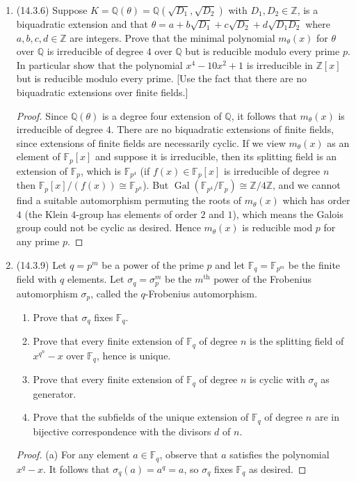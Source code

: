 \documentclass[11pt]{article}
\DeclareMathOperator{\Gal}{Gal}
\DeclareMathOperator{\id}{id}
\begin{document}
\begin{enumerate}
\begin{proof}
        (e) Observe that the group above is given by the presentation $\abr{\sigma,\tau\mid \sigma^4=\id_E,\sigma^2=\tau^2,\sigma\tau = \tau\sigma^{-1}}$, which is $Q_8$, the quaternion group of order $8$, up to isomorphism.
        \end{proof}
    \item (14.3.6) Suppose $K = \mathbb{Q}(\theta) = \mathbb{Q}(\sqrt{D_1},\sqrt{D_2})$ with $D_1,D_2\in\mathbb{Z}$, is a biquadratic extension and that $\theta = a+b\sqrt{D_1} + c\sqrt{D_2} + d\sqrt{D_1D_2}$ where $a,b,c,d\in\mathbb{Z}$ are integers. Prove that the minimal polynomial $m_\theta(x)$ for $\theta$ over $\mathbb{Q}$ is irreducible of degree $4$ over $\mathbb{Q}$ but is reducible modulo every prime $p$. In particular show that the polynomial $x^4-10x^2+1$ is irreducible in $\mathbb{Z}[x]$ but is reducible modulo every prime. [Use the fact that there are no biquadratic extensions over finite fields.] \begin{proof}
        Since $\mathbb{Q}(\theta)$ is a degree four extension of $\mathbb{Q}$, it follows that $m_\theta(x)$ is irreducible of degree $4$. There are no biquadratic extensions of finite fields, since extensions of finite fields are necessarily cyclic. If we view $m_\theta(x)$ as an element of $\mathbb{F}_p[x]$ and suppose it is irreducible, then its splitting field is an extension of $\mathbb{F}_p$, which is $\mathbb{F}_{p^4}$ (if $f(x)\in \mathbb{F}_p[x]$ is irreducible of degree $n$ then $\mathbb{F}_p[x]/(f(x))\cong \mathbb{F}_{p^n}$). But $\Gal(\mathbb{F}_{p^4}/\mathbb{F}_p)\cong \mathbb{Z}/4\mathbb{Z}$, and we cannot find a suitable automorphism permuting the roots of $m_\theta(x)$ which has order $4$ (the Klein $4$-group has elements of order $2$ and $1$), which means the Galois group could not be cyclic as desired. Hence $m_\theta(x)$ is reducible mod $p$ for any prime $p$.
    \end{proof}
    \item (14.3.9) Let $q = p^m$ be a power of the prime $p$ and let $\mathbb{F}_q = \mathbb{F}_{p^m}$ be the finite field with $q$ elements. Let $\sigma_q = \sigma_p^m$ be the $m^{\text{th}}$ power of the Frobenius automorphism $\sigma_p$, called the $q$-Frobenius automorphism. \begin{enumerate}
        \item Prove that $\sigma_q$ fixes $\mathbb{F}_q$.
        \item Prove that every finite extension of $\mathbb{F}_q$ of degree $n$ is the splitting field of $x^{q^n}-x$ over $\mathbb{F}_q$, hence is unique.
        \item Prove that every finite extension of $\mathbb{F}_q$ of degree $n$ is cyclic with $\sigma_q$ as generator.
        \item Prove that the subfields of the unique extension of $\mathbb{F}_q$ of degree $n$ are in bijective correspondence with the divisors $d$ of $n$.
    \end{enumerate}
    \begin{proof}
        (a) For any element $a\in\mathbb{F}_q$, observe that $a$ satisfies the polynomial $x^q-x$. It follows that $\sigma_q(a) = a^q = a$, so $\sigma_q$ fixes $\mathbb{F}_q$ as desired.


\end{proof}
\end{enumerate}
\end{document}
